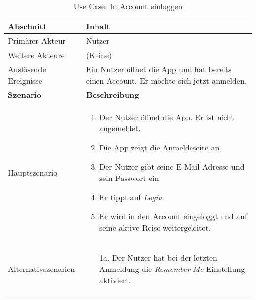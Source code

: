 \begin{table}[H]
	\footnotesize
	\caption{Use Case: In Account einloggen}
	\begin{tabularx}{0.95\textwidth}{ |l|X| }
		\hline
		\rowcolor{gray} \textbf{Abschnitt}     & \textbf{Inhalt}                                                                                                                       \\
		\hline
		Primärer Akteur                        & Nutzer                                                                                                                                \\
		\hline
		Weitere Akteure                        & (Keine)                                                                                                                               \\
		\hline
		Auslösende Ereignisse                  & Ein Nutzer öffnet die App und hat bereits einen Account. Er möchte sich jetzt anmelden.                                               \\
		\hline
		\rowcolor{lightgray} \textbf{Szenario} & \textbf{Beschreibung}                                                                                                                 \\
		\hline
		Hauptszenario                          & \begin{enumerate}
			                                         \item Der Nutzer öffnet die App. Er ist nicht angemeldet.
			                                         \item Die App zeigt die Anmeldeseite an.
			                                         \item Der Nutzer gibt seine E-Mail-Adresse und sein Passwort ein.
			                                         \item Er tippt auf \emph{Login}.
			                                         \item Er wird in den Account eingeloggt und auf seine aktive Reise weitergeleitet.
		                                         \end{enumerate}                                                     \\
		\hline
		Alternativszenarien                    & \begin{enumerate}
			                                         \item[1a.] Der Nutzer hat bei der letzten Anmeldung die \emph{Remember Me}-Einstellung aktiviert.

\end{enumerate}
\end{tabularx}
\end{table}
